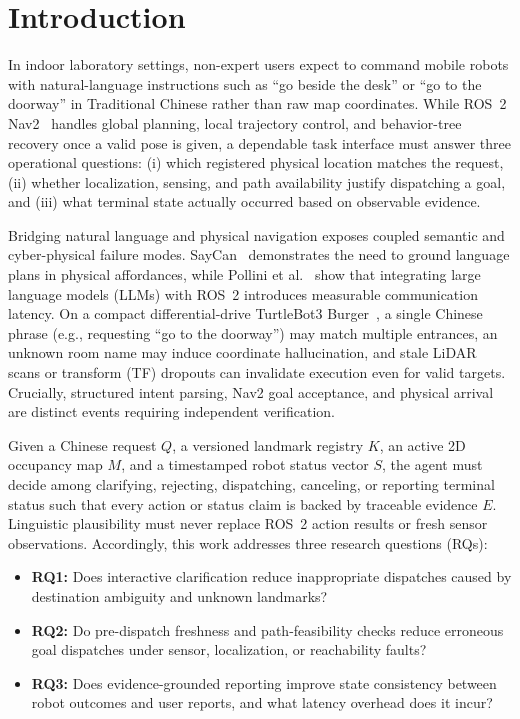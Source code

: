 \documentclass[conference,a4paper]{IEEEtran}
\begin{document}
\section{Introduction}

In indoor laboratory settings, non-expert users expect to command mobile robots with natural-language instructions such as ``go beside the desk'' or ``go to the doorway'' in Traditional Chinese rather than raw map coordinates. While ROS~2 Nav2~\cite{b4} handles global planning, local trajectory control, and behavior-tree recovery once a valid pose is given, a dependable task interface must answer three operational questions: (i) which registered physical location matches the request, (ii) whether localization, sensing, and path availability justify dispatching a goal, and (iii) what terminal state actually occurred based on observable evidence.

Bridging natural language and physical navigation exposes coupled semantic and cyber-physical failure modes. SayCan~\cite{b2} demonstrates the need to ground language plans in physical affordances, while Pollini et al.~\cite{b3} show that integrating large language models (LLMs) with ROS~2 introduces measurable communication latency. On a compact differential-drive TurtleBot3 Burger~\cite{b8}, a single Chinese phrase (e.g., requesting ``go to the doorway'') may match multiple entrances, an unknown room name may induce coordinate hallucination, and stale LiDAR scans or transform (TF) dropouts can invalidate execution even for valid targets. Crucially, structured intent parsing, Nav2 goal acceptance, and physical arrival are distinct events requiring independent verification.

Given a Chinese request $Q$, a versioned landmark registry $K$, an active 2D occupancy map $M$, and a timestamped robot status vector $S$, the agent must decide among clarifying, rejecting, dispatching, canceling, or reporting terminal status such that every action or status claim is backed by traceable evidence $E$. Linguistic plausibility must never replace ROS~2 action results or fresh sensor observations. Accordingly, this work addresses three research questions (RQs):
\begin{itemize}
    \item \textbf{RQ1:} Does interactive clarification reduce inappropriate dispatches caused by destination ambiguity and unknown landmarks?
    \item \textbf{RQ2:} Do pre-dispatch freshness and path-feasibility checks reduce erroneous goal dispatches under sensor, localization, or reachability faults?
    \item \textbf{RQ3:} Does evidence-grounded reporting improve state consistency between robot outcomes and user reports, and what latency overhead does it incur?
\end{itemize}
\end{document}
